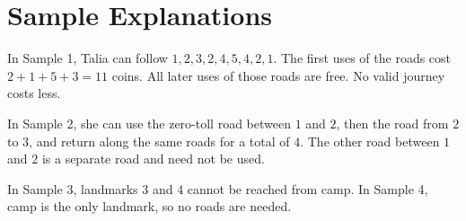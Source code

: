 \section*{Sample Explanations}
In Sample 1, Talia can follow
$1,2,3,2,4,5,4,2,1$. The first uses of the roads cost
$2+1+5+3=11$ coins. All later uses of those roads are free.
No valid journey costs less.

In Sample 2, she can use the zero-toll road between $1$ and $2$, then the
road from $2$ to $3$, and return along the same roads for a total of $4$.
The other road between $1$ and $2$ is a separate road and need not be used.

In Sample 3, landmarks $3$ and $4$ cannot be reached from camp. In Sample 4,
camp is the only landmark, so no roads are needed.
